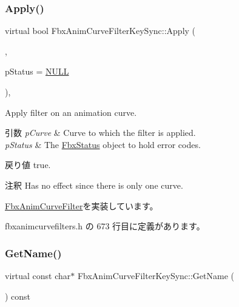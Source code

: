 \subsubsection{\texorpdfstring{Apply()}{Apply()}\hspace{0.1cm}{\footnotesize\ttfamily [5/5]}}
{\footnotesize\ttfamily virtual bool Fbx\+Anim\+Curve\+Filter\+Key\+Sync\+::\+Apply (\begin{DoxyParamCaption}\item[{\hyperlink{class_fbx_anim_curve}{Fbx\+Anim\+Curve} \&}]{,  }\item[{\hyperlink{class_fbx_status}{Fbx\+Status} $\ast$}]{p\+Status = {\ttfamily \hyperlink{fbxarch_8h_a070d2ce7b6bb7e5c05602aa8c308d0c4}{N\+U\+LL}} }\end{DoxyParamCaption})\hspace{0.3cm}{\ttfamily [inline]}, {\ttfamily [virtual]}}

Apply filter on an animation curve. 
\begin{DoxyParams}{引数}
{\em p\+Curve} & Curve to which the filter is applied. \\
\hline
{\em p\+Status} & The \hyperlink{class_fbx_status}{Fbx\+Status} object to hold error codes. \\
\hline
\end{DoxyParams}
\begin{DoxyReturn}{戻り値}
{\ttfamily true}. 
\end{DoxyReturn}
\begin{DoxyRemark}{注釈}
Has no effect since there is only one curve. 
\end{DoxyRemark}


\hyperlink{class_fbx_anim_curve_filter_a6a69996c47c0e6f63a0f8b0d5fa806a0}{Fbx\+Anim\+Curve\+Filter}を実装しています。



 fbxanimcurvefilters.\+h の 673 行目に定義があります。

\mbox{\label{class_fbx_anim_curve_filter_key_sync_acf561aadd8d5f4b35826044c6d50b6b4}} 
\subsubsection{\texorpdfstring{Get\+Name()}{GetName()}}
{\footnotesize\ttfamily virtual const char$\ast$ Fbx\+Anim\+Curve\+Filter\+Key\+Sync\+::\+Get\+Name (\begin{DoxyParamCaption}{ }\end{DoxyParamCaption}) const\hspace{0.3cm}{\ttfamily [virtual]}}

